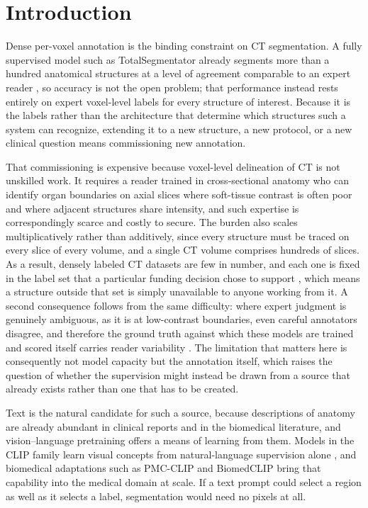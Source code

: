 \section{Introduction}
\label{sec:intro}

Dense per-voxel annotation is the binding constraint on CT segmentation. A
fully supervised model such as TotalSegmentator already segments more than a
hundred anatomical structures at a level of agreement comparable to an expert
reader \cite{wasserthal2023totalsegmentator}, so accuracy is not the open
problem; that performance instead rests entirely on expert voxel-level labels
for every structure of interest. Because it is the labels rather than the
architecture that determine which structures such a system can recognize,
extending it to a new structure, a new protocol, or a new clinical question
means commissioning new annotation.

That commissioning is expensive because voxel-level delineation of CT is not
unskilled work. It requires a reader trained in cross-sectional anatomy who can
identify organ boundaries on axial slices where soft-tissue contrast is often
poor and where adjacent structures share intensity, and such expertise is
correspondingly scarce and costly to secure. The burden also scales
multiplicatively rather than additively, since every structure must be traced on
every slice of every volume, and a single CT volume comprises hundreds of
slices. As a result, densely labeled CT datasets are few in number, and each
one is fixed in the label set that a particular funding decision chose to
support \cite{ji2022amos, luo2022word, rister2020ctorg}, which means a structure
outside that set is simply unavailable to anyone working from it. A second
consequence follows from the same difficulty: where expert judgment is genuinely
ambiguous, as it is at low-contrast boundaries, even careful annotators
disagree, and therefore the ground truth against which these models are trained
and scored itself carries reader variability \cite{nikolov2021nsd}. The
limitation that matters here is consequently not model capacity but the
annotation itself, which raises the question of whether the supervision might
instead be drawn from a source that already exists rather than one that has to
be created.

Text is the natural candidate for such a source, because descriptions of
anatomy are already abundant in clinical reports and in the biomedical
literature, and vision--language pretraining offers a means of learning from
them. Models in the CLIP family learn visual concepts from natural-language
supervision alone \cite{radford2021clip, zhai2023siglip}, and biomedical
adaptations such as PMC-CLIP \cite{lin2023pmcclip} and BiomedCLIP
\cite{zhang2025biomedclip} bring that capability into the medical domain at
scale. If a text prompt could select a region as well as it selects a label,
segmentation would need no pixels at all.

